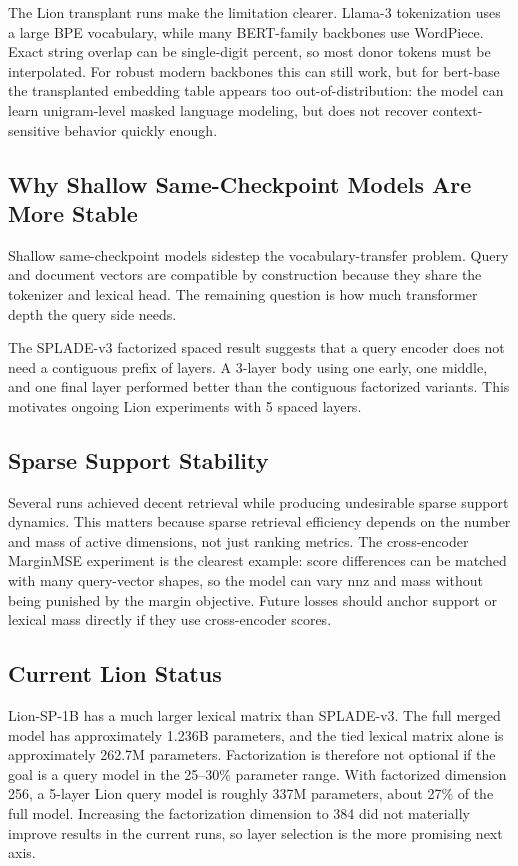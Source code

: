 \documentclass[
]{ceurart}
\begin{document}
The Lion transplant runs make the limitation clearer. Llama-3 tokenization uses
a large BPE vocabulary, while many BERT-family backbones use WordPiece. Exact
string overlap can be single-digit percent, so most donor tokens must be
interpolated. For robust modern backbones this can still work, but for
bert-base the transplanted embedding table appears too out-of-distribution: the
model can learn unigram-level masked language modeling, but does not recover
context-sensitive behavior quickly enough.

\subsection{Why Shallow Same-Checkpoint Models Are More Stable}

Shallow same-checkpoint models sidestep the vocabulary-transfer problem. Query
and document vectors are compatible by construction because they share the
tokenizer and lexical head. The remaining question is how much transformer depth
the query side needs.

The SPLADE-v3 factorized spaced result suggests that a query encoder does not
need a contiguous prefix of layers. A 3-layer body using one early, one middle,
and one final layer performed better than the contiguous factorized variants.
This motivates ongoing Lion experiments with 5 spaced layers.

\subsection{Sparse Support Stability}

Several runs achieved decent retrieval while producing undesirable sparse
support dynamics. This matters because sparse retrieval efficiency depends on
the number and mass of active dimensions, not just ranking metrics. The
cross-encoder MarginMSE experiment is the clearest example: score differences
can be matched with many query-vector shapes, so the model can vary nnz and mass
without being punished by the margin objective. Future losses should anchor
support or lexical mass directly if they use cross-encoder scores.

\subsection{Current Lion Status}

Lion-SP-1B has a much larger lexical matrix than SPLADE-v3. The full merged
model has approximately 1.236B parameters, and the tied lexical matrix alone is
approximately 262.7M parameters. Factorization is therefore not optional if the
goal is a query model in the 25--30\% parameter range. With
factorized dimension 256, a 5-layer Lion query model is roughly 337M
parameters, about 27\% of the full model. Increasing the factorization dimension
to 384 did not materially improve results in the current runs, so layer
selection is the more promising next axis.
\end{document}
